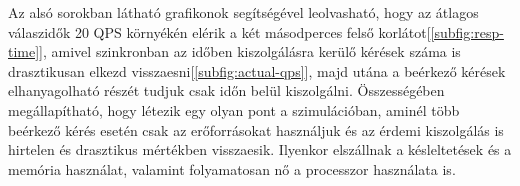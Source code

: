 Az alsó sorokban látható grafikonok segítségével leolvasható, hogy az átlagos válaszidők 20 QPS környékén elérik a két másodperces felső korlátot[\ref{subfig:resp-time}], amivel szinkronban az időben kiszolgálásra kerülő kérések száma is drasztikusan elkezd visszaesni[\ref{subfig:actual-qps}], majd utána a beérkező kérések elhanyagolható részét tudjuk csak időn belül kiszolgálni. 
Összességében megállapítható, hogy létezik egy olyan pont a szimulációban, aminél több beérkező kérés esetén csak az erőforrásokat használjuk és az érdemi kiszolgálás is hirtelen és drasztikus mértékben visszaesik.
Ilyenkor elszállnak a késleltetések és a memória használat, valamint folyamatosan nő a processzor használata is.


